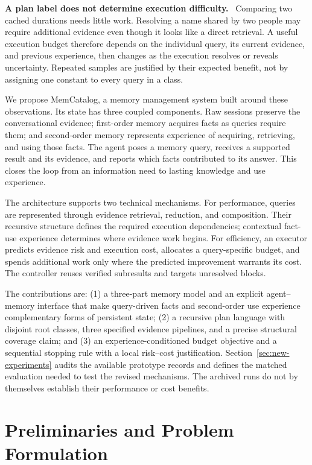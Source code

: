 \documentclass[10pt,twocolumn]{article}
\newcommand{\sys}{MemCatalog}
\newcommand{\runin}[1]{\smallskip\noindent\textbf{#1.}\ }
\begin{document}
\runin{A plan label does not determine execution difficulty}
Comparing two cached durations needs little work. Resolving a name
shared by two people may require additional evidence even though it
looks like a direct retrieval. A useful execution budget therefore
depends on the individual query, its current evidence, and previous
experience, then changes as the execution resolves or reveals
uncertainty. Repeated samples are justified by their expected benefit,
not by assigning one constant to every query in a class.

We propose \sys{}, a memory management system built around these
observations. Its state has three coupled components. Raw sessions
preserve the conversational evidence; first-order memory acquires facts
as queries require them; and second-order memory represents experience
of acquiring, retrieving, and using those facts. The agent poses a
memory query, receives a supported result and its evidence, and reports
which facts contributed to its answer. This closes the loop from an
information need to lasting knowledge and use experience.

The architecture supports two technical mechanisms. For performance,
queries are represented through evidence retrieval, reduction, and
composition. Their recursive structure defines the required execution
dependencies; contextual fact-use experience determines where evidence
work begins. For efficiency, an executor predicts evidence risk and
execution cost, allocates a query-specific budget, and spends additional
work only where the predicted improvement warrants its cost. The
controller reuses verified subresults and targets unresolved blocks.

The contributions are: (1) a three-part memory model and an explicit
agent--memory interface that make query-driven facts and second-order
use experience complementary forms of persistent state; (2) a recursive
plan language with disjoint root classes, three specified evidence
pipelines, and a precise structural coverage claim; and (3) an
experience-conditioned budget objective and a sequential stopping rule
with a local risk--cost justification. Section~\ref{sec:new-experiments}
audits the available prototype records and defines the matched
evaluation needed to test the revised mechanisms. The archived runs
do not by themselves establish their performance or cost benefits.

\section{Preliminaries and Problem Formulation}
\label{sec:new-preliminaries}
\end{document}

